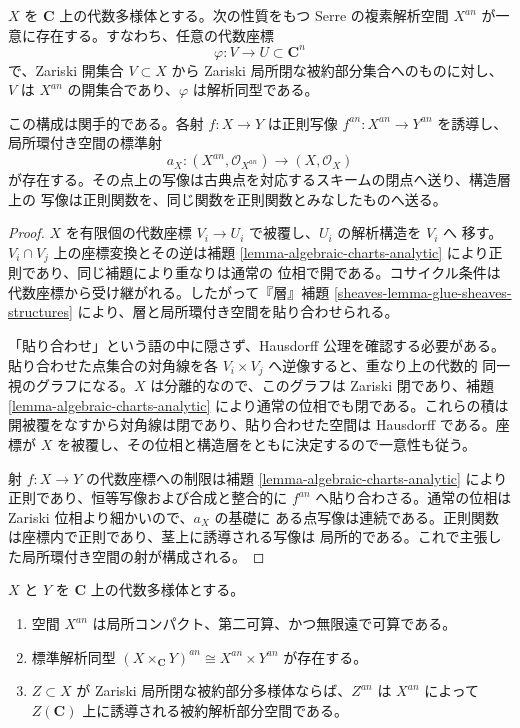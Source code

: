 \begin{proposition}
\label{proposition-analytification}
$X$ を $\mathbf C$ 上の代数多様体とする。次の性質をもつ Serre の複素解析空間
$X^{an}$ が一意に存在する。すなわち、任意の代数座標
$$
\varphi : V \longrightarrow U \subset \mathbf C^n
$$
で、Zariski 開集合 $V \subset X$ から Zariski 局所閉な被約部分集合へのものに対し、
$V$ は $X^{an}$ の開集合であり、$\varphi$ は解析同型である。

この構成は関手的である。各射 $f : X \to Y$ は正則写像
$f^{an} : X^{an} \to Y^{an}$ を誘導し、局所環付き空間の標準射
$$
a_X : (X^{an}, \mathcal O_{X^{an}}) \longrightarrow
(X, \mathcal O_X)
$$
が存在する。その点上の写像は古典点を対応するスキームの閉点へ送り、構造層上の
写像は正則関数を、同じ関数を正則関数とみなしたものへ送る。
\end{proposition}

\begin{proof}
$X$ を有限個の代数座標 $V_i \to U_i$ で被覆し、$U_i$ の解析構造を $V_i$ へ
移す。$V_i \cap V_j$ 上の座標変換とその逆は補題
\ref{lemma-algebraic-charts-analytic} により正則であり、同じ補題により重なりは通常の
位相で開である。コサイクル条件は代数座標から受け継がれる。したがって『層』補題
\ref{sheaves-lemma-glue-sheaves-structures} により、層と局所環付き空間を貼り合わせられる。

「貼り合わせ」という語の中に隠さず、Hausdorff 公理を確認する必要がある。
貼り合わせた点集合の対角線を各 $V_i \times V_j$ へ逆像すると、重なり上の代数的
同一視のグラフになる。$X$ は分離的なので、このグラフは Zariski 閉であり、補題
\ref{lemma-algebraic-charts-analytic} により通常の位相でも閉である。これらの積は
開被覆をなすから対角線は閉であり、貼り合わせた空間は Hausdorff である。座標が
$X$ を被覆し、その位相と構造層をともに決定するので一意性も従う。

射 $f : X \to Y$ の代数座標への制限は補題
\ref{lemma-algebraic-charts-analytic} により正則であり、恒等写像および合成と整合的に
$f^{an}$ へ貼り合わさる。通常の位相は Zariski 位相より細かいので、$a_X$ の基礎に
ある点写像は連続である。正則関数は座標内で正則であり、茎上に誘導される写像は
局所的である。これで主張した局所環付き空間の射が構成される。
\end{proof}

\begin{lemma}
\label{lemma-analytification-properties}
$X$ と $Y$ を $\mathbf C$ 上の代数多様体とする。
\begin{enumerate}
\item 空間 $X^{an}$ は局所コンパクト、第二可算、かつ無限遠で可算である。
\item 標準解析同型
$(X \times_{\mathbf C} Y)^{an} \cong X^{an} \times Y^{an}$ が存在する。
\item $Z \subset X$ が Zariski 局所閉な被約部分多様体ならば、$Z^{an}$ は
$X^{an}$ によって $Z(\mathbf C)$ 上に誘導される被約解析部分空間である。
\end{enumerate}
\end{lemma}

